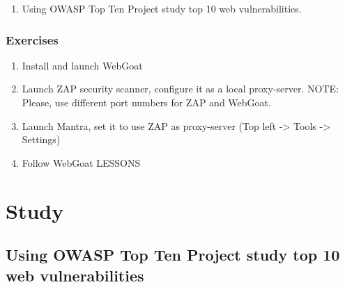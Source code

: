 \documentclass[14pt,a4paper,report]{report}
\begin{document}
\begin{enumerate}
	\item Using OWASP Top Ten Project study top 10 web vulnerabilities.
\end{enumerate}

\subsubsection{Exercises}

\begin{enumerate}
	\item Install and launch WebGoat
	\item Launch ZAP security scanner, configure it as a local proxy-server. NOTE: Please, use different port numbers for ZAP and WebGoat.
	\item Launch Mantra, set it to use ZAP as proxy-server (Top left -> Tools -> Settings)
	\item Follow WebGoat LESSONS
\end{enumerate}

\section{Study}

\subsection{Using OWASP Top Ten Project study top 10 web vulnerabilities}
\end{document}
